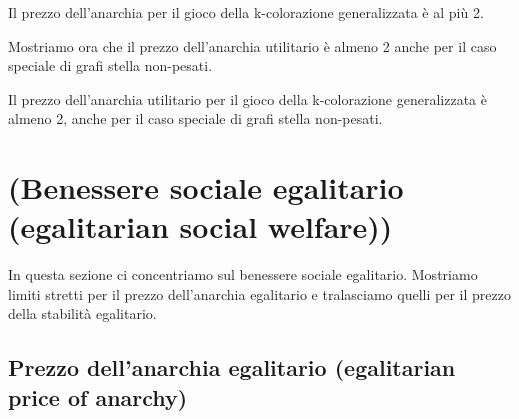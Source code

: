 \begin{theorem}
	Il prezzo dell'anarchia per il gioco della k-colorazione generalizzata è al più 2. 
\end{theorem}

Mostriamo ora che il prezzo dell'anarchia utilitario è almeno 2 anche per il caso speciale di grafi stella non-pesati.\\

\begin{theorem}
	Il prezzo dell'anarchia utilitario per il gioco della k-colorazione generalizzata è almeno 2, anche per il caso speciale di grafi stella non-pesati.
\end{theorem}

\section{(Benessere sociale egalitario (egalitarian social welfare))}
\justify
In questa sezione ci concentriamo sul benessere sociale egalitario. Mostriamo limiti stretti per il prezzo dell'anarchia egalitario e tralasciamo quelli per il prezzo della stabilità egalitario.\\

\subsection{Prezzo dell'anarchia egalitario (egalitarian price of anarchy)}
\justify